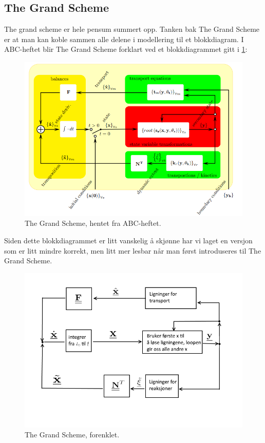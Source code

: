\subsection{The Grand Scheme}
The grand scheme er hele pensum summert opp. Tanken bak The Grand Scheme er at man kan koble sammen alle delene i modellering til et blokkdiagram. I ABC-heftet blir The Grand Scheme forklart ved et blokkdiagrammet gitt i \cref{fig:grand_scheme_hard}:

\begin{figure}[H]
    \centering
    \includegraphics[scale=0.7]{Figures/The_grand_scheme_hard}
    \caption{The Grand Scheme, hentet fra ABC-heftet.}
    \label{fig:grand_scheme_hard}
\end{figure}

Siden dette blokkdiagrammet er litt vanskelig å skjønne har vi laget en versjon som er litt mindre korrekt, men litt mer lesbar når man først introduseres til The Grand Scheme.

\begin{figure}[H]
    \centering
    \includegraphics[scale=0.7]{Figures/The_grand_scheme_enkel.png}
    \caption{The Grand Scheme, forenklet.}
    \label{fig:grand_scheme_enkel}
\end{figure}

